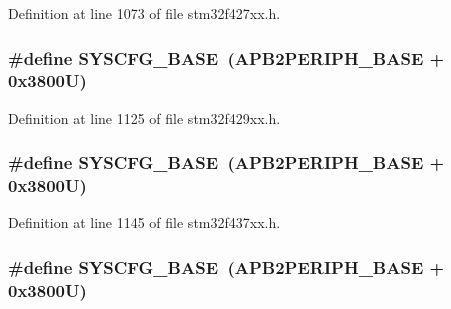 Definition at line 1073 of file stm32f427xx.\+h.

\subsubsection[{\texorpdfstring{S\+Y\+S\+C\+F\+G\+\_\+\+B\+A\+SE}{SYSCFG_BASE}}]{\setlength{\rightskip}{0pt plus 5cm}\#define S\+Y\+S\+C\+F\+G\+\_\+\+B\+A\+SE~({\bf A\+P\+B2\+P\+E\+R\+I\+P\+H\+\_\+\+B\+A\+SE} + 0x3800\+U)}\hypertarget{group___peripheral__memory__map_ga62246020bf3b34b6a4d8d0e84ec79d3d}{}\label{group___peripheral__memory__map_ga62246020bf3b34b6a4d8d0e84ec79d3d}


Definition at line 1125 of file stm32f429xx.\+h.

\subsubsection[{\texorpdfstring{S\+Y\+S\+C\+F\+G\+\_\+\+B\+A\+SE}{SYSCFG_BASE}}]{\setlength{\rightskip}{0pt plus 5cm}\#define S\+Y\+S\+C\+F\+G\+\_\+\+B\+A\+SE~({\bf A\+P\+B2\+P\+E\+R\+I\+P\+H\+\_\+\+B\+A\+SE} + 0x3800\+U)}\hypertarget{group___peripheral__memory__map_ga62246020bf3b34b6a4d8d0e84ec79d3d}{}\label{group___peripheral__memory__map_ga62246020bf3b34b6a4d8d0e84ec79d3d}


Definition at line 1145 of file stm32f437xx.\+h.

\subsubsection[{\texorpdfstring{S\+Y\+S\+C\+F\+G\+\_\+\+B\+A\+SE}{SYSCFG_BASE}}]{\setlength{\rightskip}{0pt plus 5cm}\#define S\+Y\+S\+C\+F\+G\+\_\+\+B\+A\+SE~({\bf A\+P\+B2\+P\+E\+R\+I\+P\+H\+\_\+\+B\+A\+SE} + 0x3800\+U)}\hypertarget{group___peripheral__memory__map_ga62246020bf3b34b6a4d8d0e84ec79d3d}{}\label{group___peripheral__memory__map_ga62246020bf3b34b6a4d8d0e84ec79d3d}


